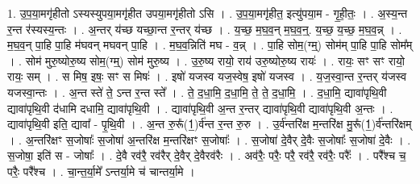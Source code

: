 \documentclass[17pt]{extarticle}
\begin{document}
1. उ॒प॒या॒मगृ॑हीतो ऽस्यस्युपया॒मगृ॑हीत उपया॒मगृ॑हीतो ऽसि । . उ॒प॒या॒मगृ॑हीत॒ इत्यु॑पया॒म - गृ॒ही॒तः॒ । . अ॒स्य॒न्त र॒न्त र॑स्यस्य॒न्तः । . अ॒न्तर् य॑च्छ यच्छा॒न्त र॒न्तर् य॑च्छ । . य॒च्छ॒ म॒घ॒व॒न् म॒घ॒व॒न्॒. य॒च्छ॒ य॒च्छ॒ म॒घ॒व॒न्न् । . म॒घ॒व॒न् पा॒हि पा॒हि म॑घवन् मघवन् पा॒हि । . म॒घ॒व॒न्निति॑ मघ - व॒न्न् । . पा॒हि सोम॒(ग्म्॒) सोम॑म् पा॒हि पा॒हि सोम᳚म् । . सोम॑ मुरु॒ष्योरु॒ष्य सोम॒(ग्म्॒) सोम॑ मुरु॒ष्य । . उ॒रु॒ष्य रायो॒ राय॑ उरु॒ष्योरु॒ष्य रायः॑ । . रायः॒ सꣳ सꣳ रायो॒ रायः॒ सम् । . स मिष॒ इषः॒ सꣳ स मिषः॑ । . इषो॑ यजस्व यज॒स्वेष॒ इषो॑ यजस्व । . य॒ज॒स्वा॒न्त र॒न्तर् य॑जस्व यजस्वा॒न्तः । . अ॒न्त स्ते॑ ते॒ ऽन्त र॒न्त स्ते᳚ । . ते॒ द॒धा॒मि॒ द॒धा॒मि॒ ते॒ ते॒ द॒धा॒मि॒ । . द॒धा॒मि॒ द्यावा॑पृथि॒वी द्यावा॑पृथि॒वी द॑धामि दधामि॒ द्यावा॑पृथि॒वी । . द्यावा॑पृथि॒वी अ॒न्त र॒न्तर् द्यावा॑पृथि॒वी द्यावा॑पृथि॒वी अ॒न्तः । . द्यावा॑पृथि॒वी इति॒ द्यावा᳚ - पृ॒थि॒वी । . अ॒न्त रु॒रू᳚(1॒)र्व॑न्त र॒न्त रु॒रु । . उ॒र्व॑न्तरि॑क्ष म॒न्तरि॑क्ष मु॒रू᳚(1॒)र्व॑न्तरि॑क्षम् । . अ॒न्तरि॑क्षꣳ स॒जोषाः᳚ स॒जोषा॑ अ॒न्तरि॑क्ष म॒न्तरि॑क्षꣳ स॒जोषाः᳚ । . स॒जोषा॑ दे॒वैर् दे॒वैः स॒जोषाः᳚ स॒जोषा॑ दे॒वैः । . स॒जोषा॒ इति॑ स - जोषाः᳚ । . दे॒वै रव॑रै॒ रव॑रैर् दे॒वैर् दे॒वैरव॑रैः । . अव॑रैः॒ परैः॒ परै॒ रव॑रै॒ रव॑रैः॒ परैः᳚ । . परै᳚श्च च॒ परैः॒ परै᳚श्च । . चा॒न्त॒र्या॒मे᳚ ऽन्तर्या॒मे च॑ चान्तर्या॒मे । \newline
\end{document}
